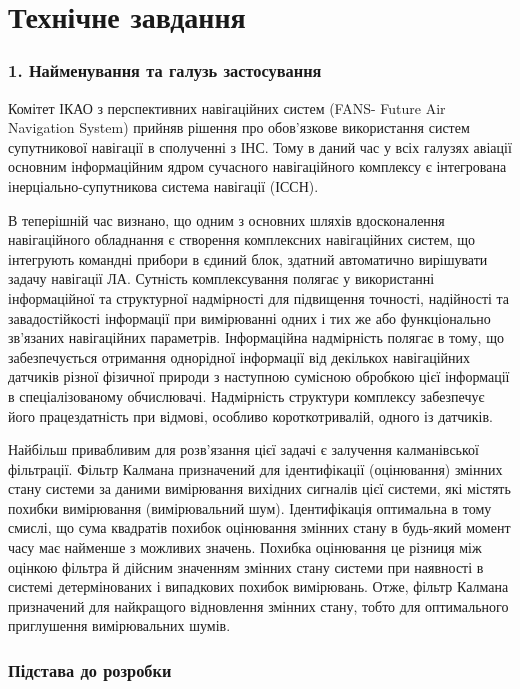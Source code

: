 \documentclass[ukrainian,utf8,simple,floatsingle,hpadding=5mm]{eskdtext}
\begin{document}


\section*{Технічне завдання}

\subsubsection*{1. Найменування та галузь застосування}
Комітет ІКАО з перспективних навігаційних систем (FANS- Future Air Navigation System) прийняв 
рішення про обов'язкове використання систем супутникової навігації в сполученні з ІНС. Тому в 
даний час у всіх галузях авіації основним інформаційним ядром сучасного навігаційного комплексу 
є інтегрована інерціально-супутникова система навігації (ІССН).

В теперішній час визнано, що одним з основних шляхів вдосконалення навігаційного обладнання 
є створення комплексних навігаційних систем, що інтегрують  командні прибори в єдиний блок, 
здатний автоматично вирішувати задачу навігації ЛА. Сутність комплексування полягає у 
використанні інформаційної та структурної надмірності для підвищення точності, надійності 
та завадостійкості інформації при вимірюванні одних і тих же або функціонально зв’язаних 
навігаційних параметрів. Інформаційна надмірність полягає в тому, що забезпечується отримання 
однорідної інформації від декількох навігаційних датчиків різної фізичної природи з наступною 
сумісною обробкою цієї інформації в спеціалізованому обчислювачі. Надмірність структури 
комплексу забезпечує його працездатність при відмові, особливо короткотривалій, одного із датчиків. 


Найбільш привабливим для розв’язання цієї задачі є залучення калманівської фільтрації. 
Фільтр Калмана призначений для ідентифікації (оцінювання) змінних стану системи за даними 
вимірювання вихідних сигналів цієї системи, які містять похибки вимірювання (вимірювальний шум). 
Ідентифікація оптимальна в тому смислі, що сума квадратів похибок оцінювання змінних стану
в будь-який момент часу має найменше з можливих значень. Похибка оцінювання це різниця 
між оцінкою фільтра й дійсним значенням змінних стану системи при наявності в системі 
детермінованих і випадкових похибок вимірювань. Отже, фільтр Калмана призначений для 
найкращого  відновлення змінних стану, тобто для оптимального приглушення вимірювальних шумів.

\subsubsection*{Підстава до розробки}
\end{document}
